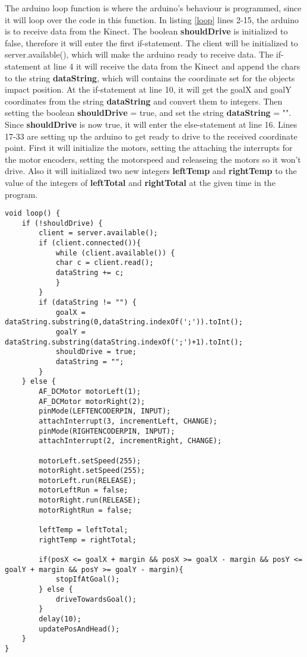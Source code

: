 The arduino loop function is where the arduino's behaviour is programmed, since it will loop over the code in this function. In listing \ref{loop} lines 2-15, the arduino is to receive data from the Kinect. The boolean \textbf{shouldDrive} is initialized to false, therefore it will enter the first if-statement. The client will be initialized to server.available(), which will make the arduino ready to receive data. The if-statement at line 4 it will receive the data from the Kinect and append the chars to the string \textbf{dataString}, which will contains the coordinate set for the objects impact position. \newline
At the if-statement at line 10, it will get the goalX and goalY coordinates from the string \textbf{dataString} and convert them to integers. Then setting the boolean \textbf{shouldDrive} = true, and set the string \textbf{dataString} = "". \newline
Since \textbf{shouldDrive} is now true, it will enter the else-statement at line 16. Lines 17-33 are setting up the arduino to get ready to drive to the received coordinate point. First it will initialize the motors, setting the attaching the interrupts for the motor encoders, setting the motorspeed and releaseing the motors so it won't drive. Also it will initialized two new integers \textbf{leftTemp} and \textbf{rightTemp} to the value of the integers of \textbf{leftTotal} and \textbf{rightTotal} at the given time in the program.

\begin{lstlisting}[caption={The arduino loop function}, label={loop}]
void loop() {
	if (!shouldDrive) {
		client = server.available();
		if (client.connected()){
			while (client.available()) {
			char c = client.read(); 
			dataString += c;
			}
		}
		if (dataString != "") {
			goalX = dataString.substring(0,dataString.indexOf(';')).toInt();
			goalY = dataString.substring(dataString.indexOf(';')+1).toInt();
			shouldDrive = true;
			dataString = "";
		}
	} else {
		AF_DCMotor motorLeft(1);
		AF_DCMotor motorRight(2);
		pinMode(LEFTENCODERPIN, INPUT);
		attachInterrupt(3, incrementLeft, CHANGE);
		pinMode(RIGHTENCODERPIN, INPUT);
		attachInterrupt(2, incrementRight, CHANGE);
		
		motorLeft.setSpeed(255);
		motorRight.setSpeed(255);			
		motorLeft.run(RELEASE);
		motorLeftRun = false;
		motorRight.run(RELEASE);
		motorRightRun = false;
		
		leftTemp = leftTotal;
		rightTemp = rightTotal;
		
		if(posX <= goalX + margin && posX >= goalX - margin && posY <= goalY + margin && posY >= goalY - margin){
			stopIfAtGoal();
		} else {
			driveTowardsGoal();  
		}
		delay(10);
		updatePosAndHead();
	}
}
\end{lstlisting}



